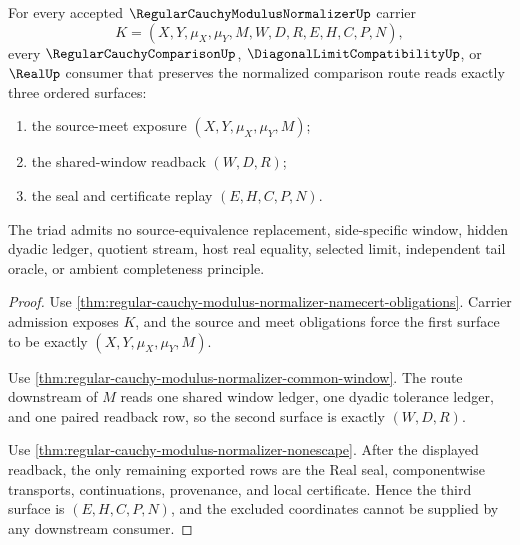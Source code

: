 \begin{theorem}
\label{thm:regular-cauchy-modulus-normalizer-source-meet-window-seal-triad}
For every accepted $\RegularCauchyModulusNormalizerUp$ carrier
$$
K=(X,Y,\mu_X,\mu_Y,M,W,D,R,E,H,C,P,N),
$$
every $\RegularCauchyComparisonUp$, $\DiagonalLimitCompatibilityUp$, or $\RealUp$ consumer that preserves the normalized comparison route reads exactly three ordered surfaces:
\begin{enumerate}
\item the source-meet exposure $(X,Y,\mu_X,\mu_Y,M)$;
\item the shared-window readback $(W,D,R)$;
\item the seal and certificate replay $(E,H,C,P,N)$.
\end{enumerate}
The triad admits no source-equivalence replacement, side-specific window, hidden dyadic ledger, quotient stream, host real equality, selected limit, independent tail oracle, or ambient completeness principle.
\end{theorem}
\begin{proof}
Use \autoref{thm:regular-cauchy-modulus-normalizer-namecert-obligations}. Carrier admission exposes $K$, and the source and meet obligations force the first surface to be exactly $(X,Y,\mu_X,\mu_Y,M)$.

Use \autoref{thm:regular-cauchy-modulus-normalizer-common-window}. The route downstream of $M$ reads one shared window ledger, one dyadic tolerance ledger, and one paired readback row, so the second surface is exactly $(W,D,R)$.

Use \autoref{thm:regular-cauchy-modulus-normalizer-nonescape}. After the displayed readback, the only remaining exported rows are the Real seal, componentwise transports, continuations, provenance, and local certificate. Hence the third surface is $(E,H,C,P,N)$, and the excluded coordinates cannot be supplied by any downstream consumer.
\end{proof}

